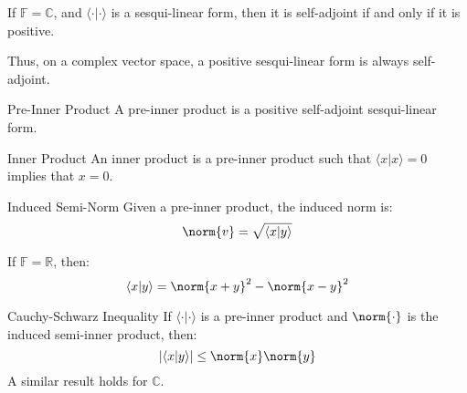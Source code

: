         \begin{theorem}
            If $\mathbb{F}=\mathbb{C}$, and
            $\langle{\cdot|\cdot}\rangle$ is a sesqui-linear
            form, then it is self-adjoint if and only if
            it is positive.
        \end{theorem}
        Thus, on a complex vector space, a positive sesqui-linear
        form is always self-adjoint.
        \begin{ldefinition}{Pre-Inner Product}
            A pre-inner product is a positive self-adjoint
            sesqui-linear form.
        \end{ldefinition}
        \begin{ldefinition}{Inner Product}
            An inner product is a pre-inner product such that
            $\langle{x|x}\rangle=0$ implies that $x=0$.
        \end{ldefinition}
        \begin{ldefinition}{Induced Semi-Norm}
            Given a pre-inner product, the induced norm is:
            \begin{equation}
                \norm{v}=\sqrt{\langle{x|y}\rangle}
            \end{equation}
        \end{ldefinition}
        If $\mathbb{F}=\mathbb{R}$, then:
        \begin{equation}
            \langle{x|y}\rangle=\norm{x+y}^{2}-\norm{x-y}^{2}
        \end{equation}
        \begin{ltheorem}{Cauchy-Schwarz Inequality}
            If $\langle{\cdot|\cdot}\rangle$ is a pre-inner product
            and $\norm{\cdot}$ is the induced semi-inner product,
            then:
            \begin{equation}
                |\langle{x|y}\rangle|\leq\norm{x}\norm{y}
            \end{equation}
            A similar result holds for $\mathbb{C}$.
        \end{ltheorem}
